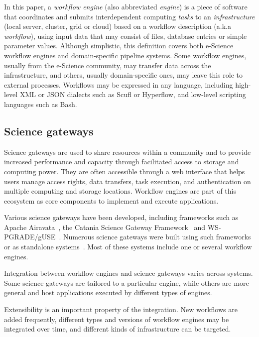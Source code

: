 \documentclass[preprint,3p,twocolumn]{elsarticle}
\begin{document}
In this paper, a
\emph{workflow engine} (also abbreviated \emph{engine}) is a piece of
software that coordinates and submits interdependent computing \emph{tasks} to an
\emph{infrastructure} (local server, cluster, grid or cloud) based on
a workflow description (a.k.a \emph{workflow}), using input data
that may consist of files, database entries or simple parameter
values. Although simplistic, this definition covers both e-Science workflow engines and
domain-specific pipeline systems.
Some workflow engines, 
usually from the e-Science community, 
may transfer data across the infrastructure, and others, usually
domain-specific ones, may leave this role to external processes. Workflows
may be expressed in any language, including high-level XML or JSON
dialects such as Scufl or Hyperflow, and low-level scripting languages
such as Bash.

\subsection{Science gateways}

\label{sec:intro_sg}

Science gateways are used to share resources within a community and to
provide increased performance and capacity through facilitated access
to storage and computing power. They are often accessible through a
web interface that helps users manage access rights, data transfers,
task execution, and authentication on multiple computing and storage
locations. Workflow engines are part of this ecosystem as core
components to implement and execute
applications. 

Various science gateways have been developed, including frameworks
such as Apache Airavata~\cite{marru2011apache}, the Catania Science
Gateway Framework~\cite{ardizzone2012decide} and
WS-PGRADE/gUSE~\cite{Kacsuk2012}. Numerous science gateways were built
using such frameworks~\cite{kacsuk2014science,ardizzone2012decide} or
as standalone systems~\cite{SHER-14,GLAT-13}. Most of these systems
include one or several workflow engines.

Integration between workflow engines and science gateways varies
across systems. Some science gateways are tailored to a particular
engine, while others are more general and host applications
executed by different types of engines. %

Extensibility is an important property of the integration. New
workflows are added frequently, different types and versions of
workflow engines may be integrated over time, and different kinds of
infrastructure can be targeted. 
\end{document}
